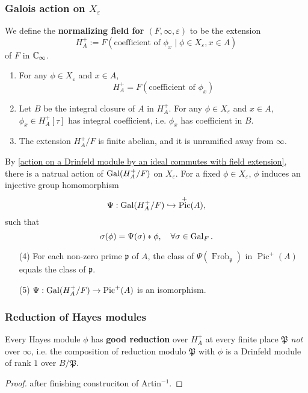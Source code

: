\documentclass{article}
\DeclareMathOperator{\pic}{Pic}
\DeclareMathOperator{\frob}{Frob}
\begin{document}
\subsubsection{Galois action on \texorpdfstring{$X_\varepsilon$}{Xepsilon}}
We define the \textbf{normalizing field for $(F, \infty, \varepsilon)$} to be the extension \[H_A^+ := F\left( \text{coefficient of }\phi_x\mid \phi\in X_\varepsilon, x\in A \right)\]
of $F$ in $\mathbb{C}_\infty$.

\begin{theorem}\label{property of HA+}
\begin{enumerate}[(1)]
    \item For any $\phi\in X_\varepsilon$ and $x\in A$,
    \[H_A^+ = F\left( \text{coefficient of }\phi_x \right)\]
    \item Let $B$ be the integral closure of $A$ in $H_A^+$.
    For any $\phi\in X_\varepsilon$ and $x\in A$, $\phi_x\in H_A^+[\tau]$ has integral coefficient, i.e. $\phi_x$ has coefficient in $B$.
    \item The extension $H_A^+/F$ is finite abelian, and it is unramified away from $\infty$.
\end{enumerate}
By \cref{action on a Drinfeld module by an ideal commutes with field extension},
there is a natrual action of $\operatorname{Gal}(H_A^+/F)$ on $X_\varepsilon$.
For a fixed $\phi\in X_\varepsilon$,
$\phi$ induces an injective group homomorphism
\[\Psi : \gal(H_A^+/F)\inject \pic^+(A),\]
such that \[\sigma(\phi) = \Psi(\sigma) * \phi,\quad \forall\sigma\in\operatorname{Gal}_F.\]
\begin{enumerate}[(1)]
    \item[(4)] For each non-zero prime $\mathfrak{p}$ of $A$,
    the class of $\Psi(\frob_\mathfrak{p})$ in $\pic^+(A)$ equals the class of $\mathfrak{p}$.
    \item[(5)] $\Psi : \gal(H_A^+/F)\to \pic^+(A)$ is an isomorphism.
\end{enumerate}

\end{theorem}

\subsubsection{Reduction of Hayes modules}

\begin{corollary}\label{Hayes modules have good reduction away from infty}
    Every Hayes module $\phi$ has \textbf{good reduction} over $H_A^+$ at every finite place $\mathfrak{P}$ \textit{not} over $\infty$, i.e. the composition of reduction modulo $\mathfrak{P}$ with $\phi$ is a Drinfeld module of rank $1$ over $B/\mathfrak{P}$.
\end{corollary}
\begin{proof}
    \color{red} after finishing construciton of Artin$^{-1}$.
\end{proof}
\end{document}
